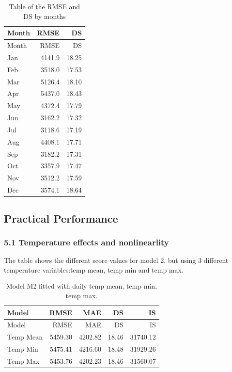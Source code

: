 \documentclass[
]{article}
\begin{document}
\begin{longtable}[]{@{}lrr@{}}
\caption{Table of the RMSE and DS by months}\tabularnewline
\toprule\noalign{}
Month & RMSE & DS \\
\midrule\noalign{}
\endfirsthead
\toprule\noalign{}
Month & RMSE & DS \\
\midrule\noalign{}
\endhead
\bottomrule\noalign{}
\endlastfoot
Jan & 4141.9 & 18.25 \\
Feb & 3518.0 & 17.53 \\
Mar & 5126.4 & 18.10 \\
Apr & 5437.0 & 18.43 \\
May & 4372.4 & 17.79 \\
Jun & 3162.2 & 17.32 \\
Jul & 3118.6 & 17.19 \\
Aug & 4408.1 & 17.71 \\
Sep & 3182.2 & 17.31 \\
Oct & 3357.9 & 17.47 \\
Nov & 3512.2 & 17.59 \\
Dec & 3574.1 & 18.64 \\
\end{longtable}

\subsection{Practical Performance}\label{practical-performance}

\subsubsection{5.1 Temperature effects and
nonlinearlity}\label{temperature-effects-and-nonlinearlity}

The table shows the different score values for model 2, but using 3
different temperature variables:temp mean, temp min and temp max.

\begin{longtable}[]{@{}lrrrr@{}}
\caption{Model M2 fitted with daily temp mean, temp min, temp
max.}\tabularnewline
\toprule\noalign{}
Model & RMSE & MAE & DS & IS \\
\midrule\noalign{}
\endfirsthead
\toprule\noalign{}
Model & RMSE & MAE & DS & IS \\
\midrule\noalign{}
\endhead
\bottomrule\noalign{}
\endlastfoot
Temp Mean & 5459.30 & 4202.82 & 18.46 & 31740.12 \\
Temp Min & 5475.41 & 4216.60 & 18.48 & 31929.26 \\
Temp Max & 5453.76 & 4202.23 & 18.46 & 31560.07 \\
\end{longtable}
\end{document}
